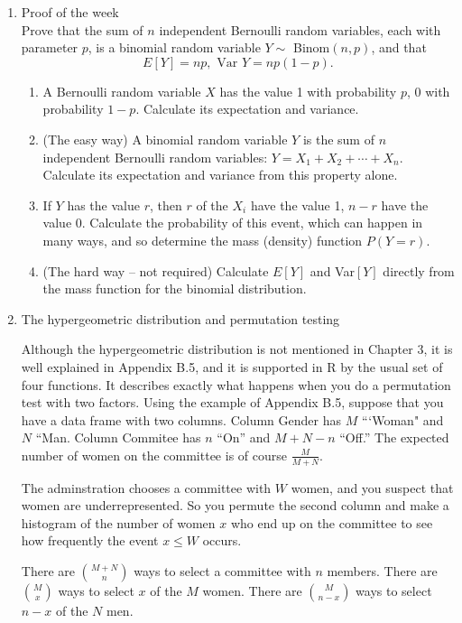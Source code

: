 \documentclass[12pt]{article}
\begin{document}
\begin{enumerate}

\item  Proof of the week \\Prove that the sum of $n$ independent Bernoulli random variables, each with parameter $p$, is a binomial random variable $ Y \sim$ Binom$(n,p)$, and that
$$E[Y] = np, \text{ Var }Y = np(1-p).$$
\begin{enumerate}
\item A Bernoulli random variable $X$ has the value 1 with probability $p$, 0 with probability $1-p.$ Calculate its expectation and variance.
\item (The easy way) A binomial random variable $Y$ is the sum of $n$ independent Bernoulli random variables: $Y = X_1 + X_2 + \cdots + X_n$. Calculate its expectation and variance from this property alone.
\item If $Y$ has the value $r$, then $r$ of the $X_i$ have the value 1, $n-r$ have the value 0. Calculate the probability of this event, which can happen in many ways, and so determine the mass (density) function $P(Y = r)$.
\item (The hard way -- not required) Calculate $E[Y]$ and Var$[Y]$ directly from the mass function for the binomial distribution.
\end{enumerate}



\pagebreak

\item The hypergeometric distribution and permutation testing

Although the hypergeometric distribution is not mentioned in Chapter 3, it is well explained in Appendix B.5, and it is supported in R by the usual set of four functions. It describes exactly what happens when you do a permutation test with two factors. Using the example of Appendix B.5, suppose that you have a data frame with two columns. Column Gender has $M$ ```Woman" and $N$ ``Man. Column Commitee has $n$ ``On'' and $M+N-n$ ``Off.'' The expected number of women on the committee is of course $\frac{M}{M+N}$. 

The adminstration chooses a committee with $W$ women, and you suspect that women are underrepresented. So you permute the second column and make a histogram of the number of women $x$ who end up on the committee to see how frequently the event $x \leq W$ occurs.

There are $\binom{M+N}{n}$ ways to select a committee with $n$ members.
There are $\binom{M}{x}$ ways to select $x$ of the $M$ women.
There are $\binom{M}{n-x}$ ways to select $n-x$ of the $N$ men.


\end{enumerate}
\end{document}
